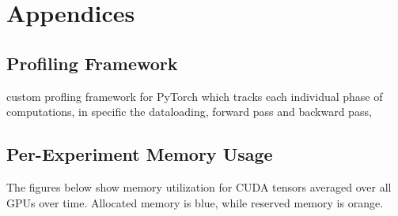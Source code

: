 \section*{Appendices}
\renewcommand{\thesubsection}{\Alph{subsection}}

\subsection{Profiling Framework}
\label{appendix:profiling}

custom profling framework for PyTorch which tracks each individual phase 
of computations, in specific the dataloading, forward pass and backward pass,



\newpage

\subsection{Per-Experiment Memory Usage}

The figures below show memory utilization for 
CUDA tensors averaged over all GPUs over time. 
Allocated memory is \textcolor{tum-dark-blue}{blue},
while reserved memory is \textcolor{tum-orange}{orange}.

